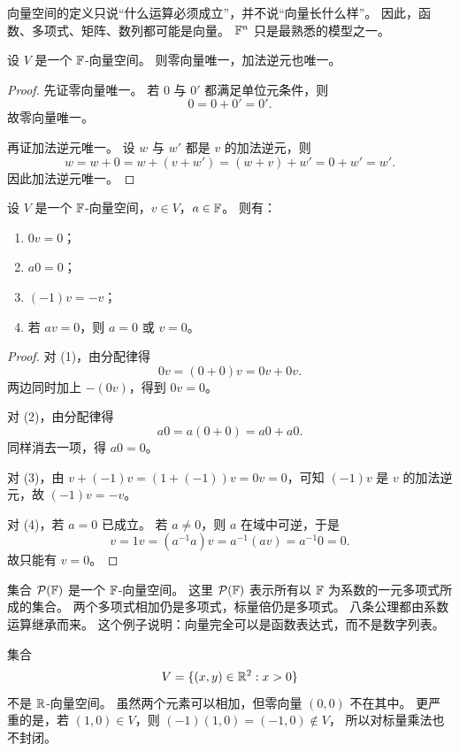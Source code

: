 \begin{remark} 向量空间的定义只说“什么运算必须成立”，并不说“向量长什么样”。
因此，函数、多项式、矩阵、数列都可能是向量。 $\mathbb{F}^n$ 只是最熟悉的模型之一。
\end{remark}

\begin{proposition} 设 $V$ 是一个 $\mathbb{F}$-向量空间。
则零向量唯一，加法逆元也唯一。 \end{proposition}

\begin{proof} 先证零向量唯一。
若 $0$ 与 $0'$ 都满足单位元条件，则 \[
0=0+0'=0'. \]
故零向量唯一。

再证加法逆元唯一。 设 $w$ 与 $w'$ 都是 $v$ 的加法逆元，则
\[ w=w+0=w+(v+w')=(w+v)+w'=0+w'=w'.
\] 因此加法逆元唯一。
\end{proof}

\begin{proposition} 设 $V$ 是一个 $\mathbb{F}$-向量空间，$v\in V$，$a\in\mathbb{F}$。
则有： \begin{enumerate}[label=\textup{(\arabic*)}]
\item $0v=0$； \item $a0=0$；
\item $(-1)v=-v$； \item 若 $av=0$，则 $a=0$ 或 $v=0$。
\end{enumerate} \end{proposition}

\begin{proof} 对 (1)，由分配律得
\[ 0v=(0+0)v=0v+0v.
\] 两边同时加上 $-(0v)$，得到 $0v=0$。

对 (2)，由分配律得 \[
a0=a(0+0)=a0+a0. \]
同样消去一项，得 $a0=0$。

对 (3)，由 $v+(-1)v=(1+(-1))v=0v=0$，可知 $(-1)v$ 是 $v$ 的加法逆元，故 $(-1)v=-v$。

对 (4)，若 $a=0$ 已成立。 若 $a\neq 0$，则 $a$ 在域中可逆，于是
\[ v=1v=(a^{-1}a)v=a^{-1}(av)=a^{-1}0=0.
\] 故只能有 $v=0$。
\end{proof}

\begin{example} 集合 $\mathcal{P}(\mathbb{F})$ 是一个 $\mathbb{F}$-向量空间。
这里 $\mathcal{P}(\mathbb{F})$ 表示所有以 $\mathbb{F}$ 为系数的一元多项式所成的集合。 两个多项式相加仍是多项式，标量倍仍是多项式。
八条公理都由系数运算继承而来。 这个例子说明：向量完全可以是函数表达式，而不是数字列表。
\end{example}

\begin{example} 集合
\[ V=\{(x,y)\in\mathbb{R}^2:x>0\}
\] 不是 $\mathbb{R}$-向量空间。
虽然两个元素可以相加，但零向量 $(0,0)$ 不在其中。 更严重的是，若 $(1,0)\in V$，则 $(-1)(1,0)=(-1,0)\notin V$，
所以对标量乘法也不封闭。 \end{example}

